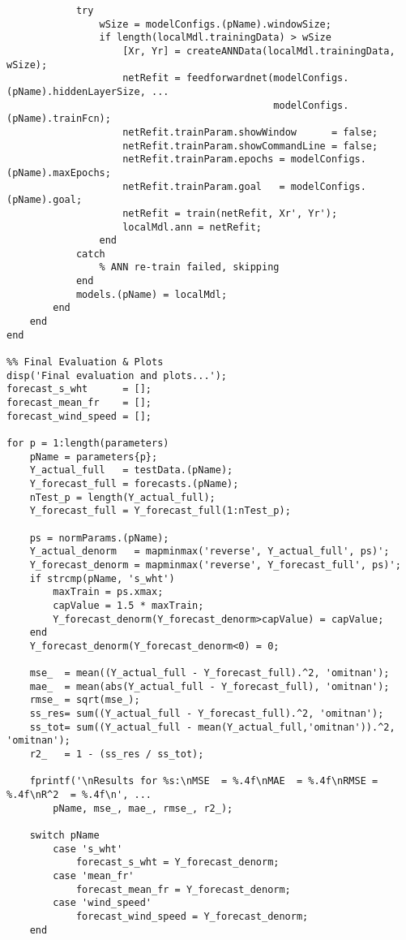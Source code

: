 \begin{verbatim}
            try
                wSize = modelConfigs.(pName).windowSize;
                if length(localMdl.trainingData) > wSize
                    [Xr, Yr] = createANNData(localMdl.trainingData, wSize);
                    netRefit = feedforwardnet(modelConfigs.(pName).hiddenLayerSize, ...
                                              modelConfigs.(pName).trainFcn);
                    netRefit.trainParam.showWindow      = false;
                    netRefit.trainParam.showCommandLine = false;
                    netRefit.trainParam.epochs = modelConfigs.(pName).maxEpochs;
                    netRefit.trainParam.goal   = modelConfigs.(pName).goal;
                    netRefit = train(netRefit, Xr', Yr');
                    localMdl.ann = netRefit;
                end
            catch
                % ANN re-train failed, skipping
            end
            models.(pName) = localMdl;
        end
    end
end

%% Final Evaluation & Plots
disp('Final evaluation and plots...');
forecast_s_wht      = [];
forecast_mean_fr    = [];
forecast_wind_speed = [];

for p = 1:length(parameters)
    pName = parameters{p};
    Y_actual_full   = testData.(pName);
    Y_forecast_full = forecasts.(pName);
    nTest_p = length(Y_actual_full);
    Y_forecast_full = Y_forecast_full(1:nTest_p);

    ps = normParams.(pName);
    Y_actual_denorm   = mapminmax('reverse', Y_actual_full', ps)';
    Y_forecast_denorm = mapminmax('reverse', Y_forecast_full', ps)';
    if strcmp(pName, 's_wht')
        maxTrain = ps.xmax;
        capValue = 1.5 * maxTrain;
        Y_forecast_denorm(Y_forecast_denorm>capValue) = capValue;
    end
    Y_forecast_denorm(Y_forecast_denorm<0) = 0;

    mse_  = mean((Y_actual_full - Y_forecast_full).^2, 'omitnan');
    mae_  = mean(abs(Y_actual_full - Y_forecast_full), 'omitnan');
    rmse_ = sqrt(mse_);
    ss_res= sum((Y_actual_full - Y_forecast_full).^2, 'omitnan');
    ss_tot= sum((Y_actual_full - mean(Y_actual_full,'omitnan')).^2, 'omitnan');
    r2_   = 1 - (ss_res / ss_tot);

    fprintf('\nResults for %s:\nMSE  = %.4f\nMAE  = %.4f\nRMSE = %.4f\nR^2  = %.4f\n', ...
        pName, mse_, mae_, rmse_, r2_);

    switch pName
        case 's_wht'
            forecast_s_wht = Y_forecast_denorm;
        case 'mean_fr'
            forecast_mean_fr = Y_forecast_denorm;
        case 'wind_speed'
            forecast_wind_speed = Y_forecast_denorm;
    end


\end{verbatim}
